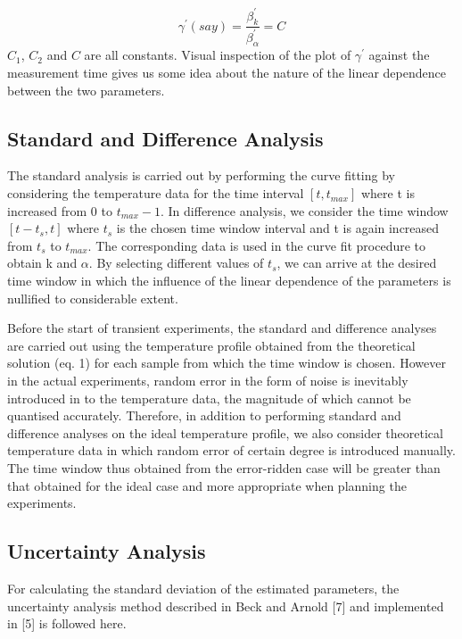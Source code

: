 \documentclass[12pt]{report}
\begin{document}
\begin{equation*}
 \gamma^{'} (say) = \frac{\beta_k^{'}}{\beta_{\alpha}^{'}} = C
\end{equation*}
$C_1$, $C_2$ and $C$ are all constants. Visual inspection of the
 plot of $\gamma^{'}$ against the measurement time gives us some idea 
about the nature of the linear dependence between the two parameters.   

\subsection*{Standard and Difference Analysis}

The standard analysis is carried out by performing the curve fitting by considering the temperature data for 
the time interval $[t,t_{max}]$ where t is increased from 0 to $t_{max}-1$. In difference analysis, we consider the time window $[t - t_s,t]$ where $t_s$ is the chosen time window interval and t is again increased from $t_s$ to $t_{max}$.  The corresponding data is used in the curve fit procedure to obtain k and $\alpha$. By selecting different values of $t_s$, we can arrive at the desired time window in which the influence of the linear dependence of the parameters is nullified to considerable extent. 

Before the start of transient experiments, the standard and difference analyses are carried out using the temperature profile obtained from the theoretical solution (eq. 1) for each sample from which the time window is chosen. However in the actual experiments, random error in the form of noise is inevitably introduced in to the temperature data, the magnitude of which cannot be quantised accurately. Therefore, in addition to performing standard and difference analyses on the ideal temperature profile, we also consider theoretical temperature data in which random error of certain degree is introduced manually. The time window thus obtained from the error-ridden case will be greater than that obtained for the ideal case and more appropriate when planning the experiments. 

\subsection*{Uncertainty Analysis}


For calculating the standard deviation of the estimated parameters, the
uncertainty analysis method described in Beck and Arnold {[}7{]} and
implemented in {[}5{]} is followed here.
\end{document}
